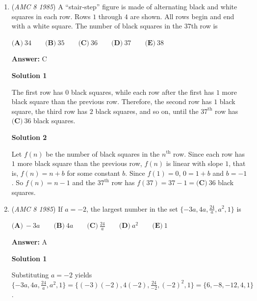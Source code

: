 \begin{enumerate}
 



\textbf{Solution 5}

Since a $7.5\ \text{cm}$ stack is $1.5$ times as thick as a $5\ \text{cm}$ stack, a $7.5\ \text{cm}$ stack contains $1.5 \cdot 500  = \boxed{\textbf{(D)}\ 750}$ sheets of paper. ~\href{https://artofproblemsolving.com/wiki/index.php?title=Shriya2}{Shriya2}

 


	\item (\textit{AMC 8 1985}) A “stair‑step” figure is made of alternating black and white squares in each row. Rows $1$ through $4$ are shown. All rows begin and end with a white square. The number of black squares in the $37$th row is


 $\textbf{(A)}\ 34 \qquad \textbf{(B)}\ 35 \qquad \textbf{(C)}\ 36 \qquad \textbf{(D)}\ 37 \qquad \textbf{(E)}\ 38$

 \textbf{Answer: }C



\textbf{Solution 1}

The first row has $0$ black squares, while each row after the first has $1$ more black square than the previous row.  Therefore, the second row has $1$ black square, the third row has $2$ black squares, and so on, until the $37^{\text{th}}$ row has $\boxed{\textbf{(C)}\ 36}$ black squares.

 



\textbf{Solution 2}

Let $f(n)$ be the number of black squares in the $n^{\text{th}}$ row.  Since each row has $1$ more black square than the previous row, $f(n)$ is linear with slope $1$, that is, $f(n) = n + b$ for some constant $b$.  Since $f(1) = 0$, $0 = 1 + b$ and $b = -1$.  So $f(n) = n-1$ and the $37^{\text{th}}$ row has $f(37) = 37 - 1 = \boxed{\textbf{(C)}\ 36}$ black squares.

 


	\item (\textit{AMC 8 1985}) If $a = - 2$, the largest number in the set $\{- 3a, 4a, \frac {24}{a}, a^2, 1 \}$ is


 $\textbf{(A)}\ -3a \qquad \textbf{(B)}\ 4a \qquad \textbf{(C)}\ \frac {24}{a} \qquad \textbf{(D)}\ a^2 \qquad \textbf{(E)}\ 1$

 \textbf{Answer: }A



\textbf{Solution 1}

Substituting $a = -2$ yields $\{ - 3a, 4a, \frac {24}{a}, a^2, 1\} = \{ (-3)(-2), 4(-2), \frac{24}{-2}, (-2)^2, 1 \}= \{ 6, -8, -12, 4, 1 \}$.


\end{enumerate}
